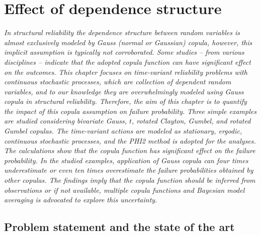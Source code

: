 \chapter{Effect of dependence structure}
\label{cha:copula}
\ifpdf
    \graphicspath{{Chapter8/Figs/Raster/}{Chapter8/Figs/PDF/}{Chapter8/Figs/}}
\else
    \graphicspath{{Chapter8/Figs/Vector/}{Chapter8/Figs/}}
\fi

\leftskip=1cm
\noindent
\emph{In structural reliability the dependence structure between random variables is almost exclusively modeled by Gauss (normal or Gaussian) copula, however, this implicit assumption is typically not corroborated. Some studies -- from various disciplines -- indicate that the adopted copula function can have significant effect on the outcomes. This chapter focuses on time-variant reliability problems with continuous stochastic processes, which are collection of dependent random variables, and to our knowledge they are overwhelmingly modeled using Gauss copula in structural reliability. Therefore, the aim of this chapter is to quantify the impact of this copula assumption on failure probability. Three simple examples are studied considering bivariate Gauss, $t$, rotated Clayton, Gumbel, and rotated Gumbel copulas. The time-variant actions are modeled as stationary, ergodic, continuous stochastic processes, and the PHI2 method is adopted for the analyses. The calculations show that the copula function has significant effect on the failure probability. In the studied examples, application of Gauss copula can four times underestimate or even ten times overestimate the failure probabilities obtained by other copulas. The findings imply that the copula function should be inferred from observations or if not available, multiple copula functions and Bayesian model averaging is advocated to explore this uncertainty.}

\leftskip=0pt\rightskip=0pt

\section{Problem statement and the state of the art}

